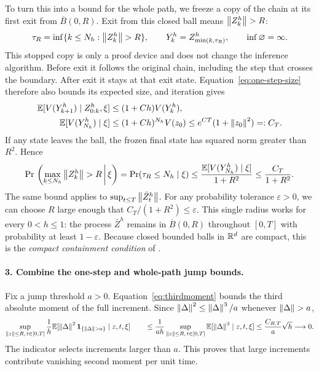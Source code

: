 To turn this into a bound for the whole path, we freeze a copy of the chain at its first exit from $\overline B(0,R)$. Exit from this closed ball means $\left\lVert Z_k^h\right\rVert>R$:
\[
 \tau_R=\inf\{k\leq N_h:\left\lVert Z_k^h\right\rVert>R\},\qquad
 Y_k^h=Z^h_{\min(k,\tau_R)},\qquad \inf\varnothing=\infty.
\]
This stopped copy is only a proof device and does not change the inference algorithm. Before exit it follows the original chain, including the step that crosses the boundary. After exit it stays at that exit state. Equation~\eqref{eq:one-step-size} therefore also bounds its expected size, and iteration gives
\begin{align}\label{eq:stopped-size}
 \mathbb E[V(Y_{k+1}^h)\mid Z^h_{0:k},\xi]
 &\leq(1+Ch)V(Y_k^h),\notag\\
 \mathbb E[V(Y_{N_h}^h)\mid\xi]
 &\leq(1+Ch)^{N_h}V(z_0)
 \leq e^{CT}(1+\left\lVert z_0\right\rVert^2)=:C_T.
\end{align}
If any state leaves the ball, the frozen final state has squared norm greater than $R^2$. Hence
\begin{equation}\label{eq:containment}
 \Pr\,\left(\max_{k\leq N_h}\left\lVert Z_k^h\right\rVert>R\,\middle|\,\xi\right)
 =\Pr(\tau_R\leq N_h\mid\xi)
 \leq\frac{\mathbb E[V(Y_{N_h}^h)\mid\xi]}{1+R^2}
 \leq\frac{C_T}{1+R^2}.
\end{equation}
The same bound applies to $\sup_{t\leq T}\left\lVert \bar Z_t^h\right\rVert$. For any probability tolerance $\varepsilon>0$, we can choose $R$ large enough that $C_T/(1+R^2)\leq\varepsilon$. This single radius works for every $0<h\leq1$: the process $\bar Z^h$ remains in $\overline B(0,R)$ throughout $[0,T]$ with probability at least $1-\varepsilon$. Because closed bounded balls in $\mathbb R^d$ are compact, this is the \emph{compact containment condition} of \citet[Chapter~3, Remark~7.3, p.~129]{ethier1986markov}.

\paragraph{3. Combine the one-step and whole-path jump bounds.}
Fix a jump threshold $a>0$. Equation~\eqref{eq:thirdmoment} bounds the third absolute moment of the full increment. Since $\left\lVert \Delta\right\rVert^2\leq\left\lVert \Delta\right\rVert^3/a$ whenever $\left\lVert \Delta\right\rVert>a$,
\begin{equation}\label{eq:smalljumps}
 \sup_{\left\lVert z\right\rVert\leq R,\,t\in[0,T]}
 \frac1h\mathbb E[\left\lVert \Delta\right\rVert^2\boldsymbol 1_{\{\left\lVert \Delta\right\rVert>a\}}\mid z,t,\xi]
 \qquad\leq\frac1{ah}
 \sup_{\left\lVert z\right\rVert\leq R,\,t\in[0,T]}\mathbb E[\left\lVert \Delta\right\rVert^3\mid z,t,\xi]
 \leq\frac{C_{R,T}}a\sqrt h\longrightarrow0.
\end{equation}
The indicator selects increments larger than $a$. This proves that large increments contribute vanishing second moment per unit time.

